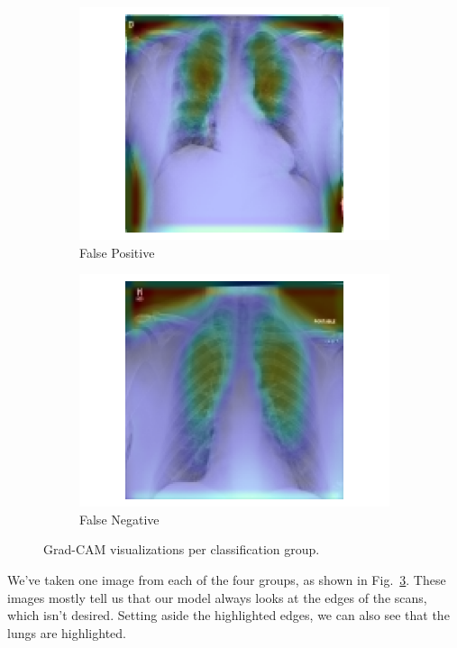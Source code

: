 \documentclass[conference]{IEEEtran}
\begin{document}
\begin{figure}[htbp]
\begin{subfigure}[b]{0.22\linewidth}
        \includegraphics[width=\linewidth]{Images/gradcam_false_pos.png}
        \caption{False Positive}
		\label{fig:false_pos}
    \end{subfigure}
    \hfill
    \begin{subfigure}[b]{0.22\linewidth}
        \includegraphics[width=\linewidth]{Images/gradcam_false_neg.png}
        \caption{False Negative}
		\label{fig:false_neg}
    \end{subfigure}
    \hfill
    \caption{Grad-CAM visualizations per classification group.}
    \label{fig:gradcam_groups}
\end{figure}

We've taken one image from each of the four groups, as shown in Fig.~\ref{fig:gradcam_groups}. These images mostly tell us that our model always looks at the edges of the scans, which isn't desired. Setting aside the highlighted edges, we can also see that the lungs are highlighted.
\end{document}

